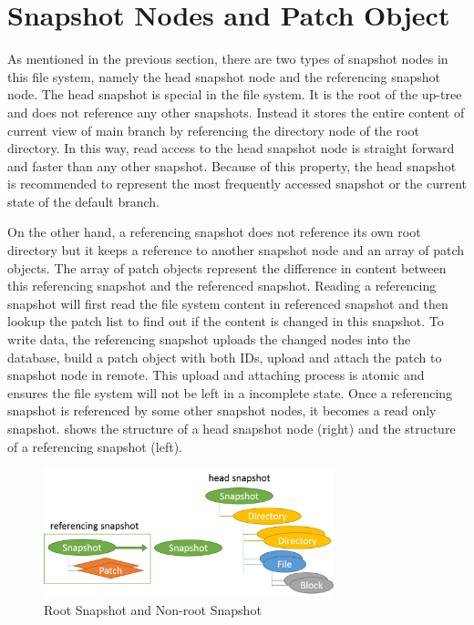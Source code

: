 \section{Snapshot Nodes and Patch Object}

    As mentioned in the previous section, there are two types of snapshot nodes in this file system, namely the head snapshot node and the referencing snapshot node. The head snapshot is special in the file system. It is the root of the up-tree and does not reference any other snapshots. Instead it stores the entire content of current view of main branch by referencing the directory node of the root directory. In this way, read access to the head snapshot node is straight forward and faster than any other snapshot. Because of this property, the head snapshot is recommended to represent the most frequently accessed snapshot or the current state of the default branch.

    On the other hand, a referencing snapshot does not reference its own root directory but it keeps a reference to another snapshot node and an array of patch objects. The array of patch objects represent the difference in content between this referencing snapshot and the referenced snapshot. Reading a referencing snapshot will first read the file system content in referenced snapshot and then lookup the patch list to find out if the content is changed in this snapshot. To write data, the referencing snapshot uploads the changed nodes into the database, build a patch object with both IDs, upload and attach the patch to snapshot node in remote. This upload and attaching process is atomic and ensures the file system will not be left in a incomplete state. Once a referencing snapshot is referenced by some other snapshot nodes, it becomes a read only snapshot.  shows the structure of a head snapshot node (right) and the structure of a referencing snapshot (left).
    
\begin{figure}[t]
\centering
\includegraphics[width=0.75\textwidth]{Chapter-4/figs/fig12.png}
\caption{Root Snapshot and Non-root Snapshot}
\label{fig:root_and_nonroot}
\end{figure}

